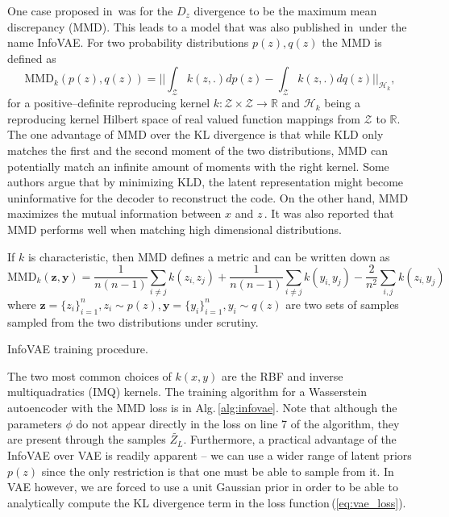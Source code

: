 One case proposed in\,\cite{tolstikhin2017wasserstein} was for the
$D_{z}$ divergence to be the maximum mean discrepancy (MMD). This
leads to a model that was also published in\,\cite{zhao2017infovae}
under the name InfoVAE. For two probability distributions $p(z),q(z)$
the MMD is defined as
\begin{equation}
\text{MMD}_{k}(p(z),q(z))=||\int_{\mathcal{Z}}k(z,.)dp(z)-\int_{\mathcal{Z}}k(z,.)dq(z)||_{\mathcal{H}_{k}},
\end{equation}
for a positive--definite reproducing kernel $k:\mathcal{Z}\times\mathcal{Z}\rightarrow\mathbb{R}$
and $\mathcal{H}_{k}$ being a reproducing kernel Hilbert space of
real valued function mappings from $\mathcal{Z}$ to $\mathbb{R}$.
The one advantage of MMD over the KL divergence is that while KLD
only matches the first and the second moment of the two distributions,
MMD can potentially match an infinite amount of moments with the right
kernel. Some authors argue that by minimizing KLD, the latent representation
might become uninformative for the decoder to reconstruct the code.
On the other hand, MMD maximizes the mutual information between $x$
and $z$\,\cite{zhao2017infovae}. It was also reported that MMD
performs well when matching high dimensional distributions. 

If $k$ is characteristic, then MMD defines a metric and can be written
down as 
\begin{equation}
\text{MMD}_{k}(\boldsymbol{z},\boldsymbol{y})=\frac{1}{n(n-1)}\sum_{i\neq j}k(z_{i,}z_{j})+\frac{1}{n(n-1)}\sum_{i\neq j}k(y_{i,}y_{j})-\frac{2}{n^{2}}\sum_{i,j}k(z_{i,}y_{j})\label{eq:mmd}
\end{equation}
where $\boldsymbol{z}=\{z_{i}\}_{i=1}^{n},z_{i}\sim p(z),\boldsymbol{y}=\{y_{i}\}_{i=1}^{n},y_{i}\sim q(z)$
are two sets of samples sampled from the two distributions under scrutiny.
\begin{algorithm}


\caption{InfoVAE training procedure.}
\label{alg:infovae}
\end{algorithm}

The two most common choices of $k(x,y)$ are the RBF and inverse multiquadratics
(IMQ) kernels. The training algorithm for a Wasserstein autoencoder
with the MMD loss is in Alg.\,\ref{alg:infovae}. Note that although
the parameters $\phi$ do not appear directly in the loss on line
7 of the algorithm, they are present through the samples $\tilde{Z_{L}}$.
Furthermore, a practical advantage of the InfoVAE over VAE is readily
apparent -- we can use a wider range of latent priors $p(z)$ since
the only restriction is that one must be able to sample from it. In
VAE however, we are forced to use a unit Gaussian prior in order to
be able to analytically compute the KL divergence term in the loss
function\,(\ref{eq:vae_loss}). 

